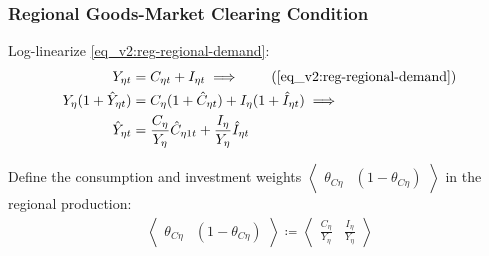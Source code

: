 \documentclass[../thesis.tex]{subfiles}
\begin{document}
	\begin{comment}
		Define the regional weights $\langle \begin{matrix} \theta_{PY1} & (1-\theta_{PY1}) \end{matrix} \rangle$ in the gross domestic production:
		\begin{align}
			\left\langle \begin{matrix} \theta_{PY1} & (1-\theta_{PY1}) \end{matrix} \right\rangle \coloneq \left\langle \begin{matrix} \frac{P_{1} Y_{1}}{P Y} & \frac{P_{2} Y_{2}}{PY} \end{matrix} \right\rangle \label{eq_v2:reg-ss-PYn-weight-in-PY}
		\end{align}
		
		Substitute \ref{eq_v2:reg-ss-PYn-weight-in-PY} in \ref{eq_v2:reg-ll-national-price-level}:
		
	\end{comment}


\subsubsection*{Regional Goods-Market Clearing Condition}

Log-linearize \ref{eq_v2:reg-regional-demand}:
\begin{align}
	Y_{\eta t} &= C_{\eta t} + I_{\eta t} \implies \tag{\ref{eq_v2:reg-regional-demand}} \\
	Y_{\eta} (1 +\hat{Y}_{\eta t}) &= C_{\eta} (1 +\hat{C}_{\eta t}) + I_{\eta} (1 +\hat{I}_{\eta t}) \implies \nonumber \\
	\hat{Y}_{\eta t} &= \frac{C_{\eta}}{Y_{\eta}} \hat{C}_{\eta 1 t} + \frac{I_{\eta}}{Y_{\eta}} \hat{I}_{\eta t} \label{eq_v2:reg-ll-total-yn}
\end{align}

Define the consumption and investment weights $\left\langle \begin{matrix} \theta_{C\eta} & (1 - \theta_{C\eta}) \end{matrix} \right\rangle$ in the regional production:
\begin{align}
	\left\langle \begin{matrix} \theta_{C\eta} & (1 - \theta_{C\eta}) \end{matrix} \right\rangle \coloneq \left\langle \begin{matrix} \frac{C_{\eta}}{Y_{\eta}} & \frac{I_{\eta}}{Y_{\eta}} \end{matrix} \right\rangle \label{eq_v2:reg-ss-C-I-weight-in-Y}
\end{align}
\end{document}
